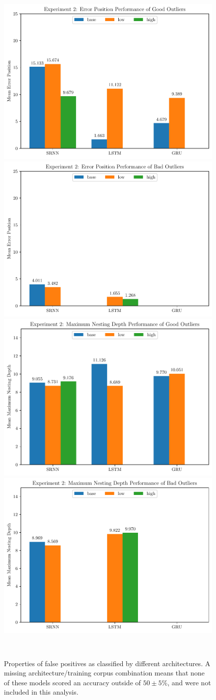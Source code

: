 \begin{figure}[!tbp]
\begin{minipage}{\textwidth}
     \centering
     \includegraphics[width=.45\textwidth]{fig/ND_error_pos_good}\quad
     \includegraphics[width=.45\textwidth]{fig/ND_error_pos_bad}\\
     \includegraphics[width=.45\textwidth]{fig/ND_max_valid_nesting_depth_good}\quad
     \includegraphics[width=.45\textwidth]{fig/ND_max_valid_nesting_depth_bad}
     \label{fig:FP_Prop_ND}
   \end{minipage}\\
  \caption{Properties of false positives as classified by different architectures. A missing architecture/training corpus combination means that none of these models scored an accuracy outside of $50 \pm  5\%$, and were not included in this analysis.}
\end{figure}

